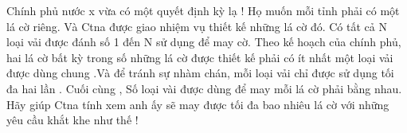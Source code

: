 Chính phủ nước x vừa có một quyết định kỳ lạ ! Họ muốn mỗi tỉnh phải có một lá cờ riêng. Và Ctna được giao nhiệm vụ thiết kế những lá cờ đó. Có tất cả N loại vải được đánh số 1 đến N sử dụng để may cờ. Theo kế hoạch của chính phủ, hai lá cờ bất kỳ trong số những lá cờ được thiết kế phải có ít nhất một loại vải được dùng chung .Và để tránh sự nhàm chán, mỗi loại vải chỉ được sử dụng tối đa hai lần . Cuối cùng , Số loại vài được dùng để may mỗi lá cờ phải bằng nhau. Hãy giúp Ctna tính xem anh ấy sẽ may được tối đa bao nhiêu lá cờ với những yêu cầu khắt khe như thế !